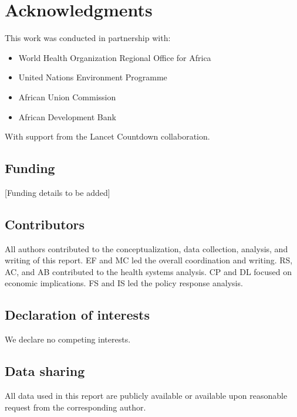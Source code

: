 \section*{Acknowledgments}

This work was conducted in partnership with:
\begin{itemize}
    \item World Health Organization Regional Office for Africa
    \item United Nations Environment Programme
    \item African Union Commission
    \item African Development Bank
\end{itemize}

\noindent With support from the Lancet Countdown collaboration.

\subsection*{Funding}
[Funding details to be added]

\subsection*{Contributors}
All authors contributed to the conceptualization, data collection, analysis, and writing of this report. EF and MC led the overall coordination and writing. RS, AC, and AB contributed to the health systems analysis. CP and DL focused on economic implications. FS and IS led the policy response analysis.

\subsection*{Declaration of interests}
We declare no competing interests.

\subsection*{Data sharing}
All data used in this report are publicly available or available upon reasonable request from the corresponding author.
